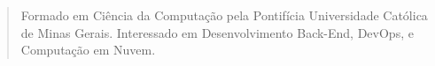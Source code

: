 \begin{quote}
    Formado em Ciência da Computação pela Pontifícia Universidade Católica de Minas Gerais. Interessado em Desenvolvimento Back-End, DevOps, e Computação em Nuvem.
\end{quote}